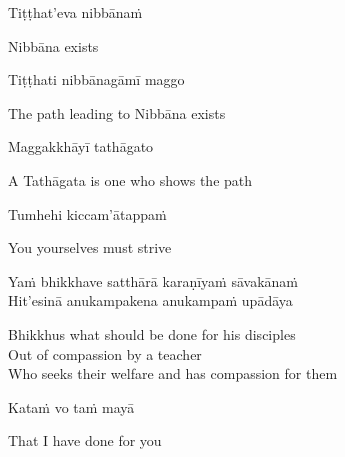 \suttaRef{[Dhp 212]}

\begin{verses}
  Tiṭṭhat'eva nibbānaṁ
\end{verses}

\begin{english}
  Nibbāna exists
\end{english}

\begin{verses}
  Tiṭṭhati nibbānagāmī maggo
\end{verses}

\begin{english}
  The path leading to Nibbāna exists
\end{english}

\begin{verses}
  Maggakkhāyī tathāgato
\end{verses}

\begin{english}
  A Tathāgata is one who shows the path
\end{english}

\suttaRef{[MN 107]}

\begin{verses}
  Tumhehi kiccam'ātappaṁ
\end{verses}

\begin{english}
  You yourselves must strive
\end{english}

\suttaRef{[Dhp 276]}

\begin{verses}
  Yaṁ bhikkhave satthārā karaṇīyaṁ sāvakānaṁ\\
  Hit'esinā anukampakena anukampaṁ upādāya
\end{verses}

\begin{english-verses}
  Bhikkhus what should be done for his disciples\\
  Out of compassion by a teacher\\
  Who seeks their welfare and has compassion for them
\end{english-verses}

\begin{verses}
  Kataṁ vo taṁ mayā
\end{verses}

\begin{english}
  That I have done for you
\end{english}

